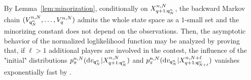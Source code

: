 By Lemma~\ref{lem:minorization}, conditionally on $X_{q+1:{\mathsf{q}}^{n}_{N}}^{n,N}$, the backward Markov chain $(V_{{\mathsf{q}}^{n}_{N}}^{n,N},\ldots,V_{q}^{n,N})$ admits the whole state space as a $1$-small set and the minorizing constant does not depend on the observations. Then, the asymptotic behavior of the normalized loglikelihood function may be analyzed by proving that, if $\ell>1$ additional players are involved in the contest, the influence of the "initial" distributions $p_{\pi}^{n,N}(\mathrm{d} v_{{\mathsf{q}}^{n}_{N}}|X^{n,N}_{q+1:{\mathsf{q}}^{n}_{N}})$ and $p_{\pi}^{n,N}(\mathrm{d} v_{{\mathsf{q}}^{n}_{N}}|X^{n,N+\ell}_{q+1:{\mathsf{q}}^{n}_{N+\ell}})$ vanishes exponentially fast by \cite{lindvall:1992}.


